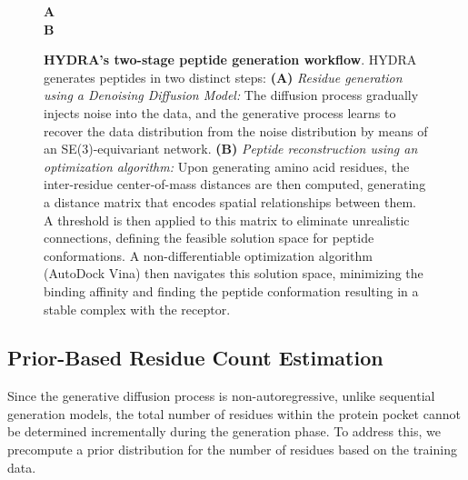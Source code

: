 \begin{figure}
  \center

  \textbf{\Large A}
   \\

  \textbf{\Large B}

  \caption{\textbf{HYDRA's two-stage peptide generation workflow}. HYDRA generates peptides in two distinct steps: \textbf{(A)} \textit{Residue generation using a Denoising Diffusion Model:} The diffusion process gradually injects noise into the data, and the generative process learns to recover the data distribution from the noise distribution by means of an SE(3)-equivariant network. \textbf{(B)} \textit{Peptide reconstruction using an optimization algorithm:} Upon generating amino acid residues, the inter-residue center-of-mass distances are then computed, generating a distance matrix that encodes spatial relationships between them. A threshold is then applied to this matrix to eliminate unrealistic connections, defining the feasible solution space for peptide conformations. A non-differentiable optimization algorithm (AutoDock Vina) then navigates this solution space, minimizing the binding affinity and finding the peptide conformation resulting in a stable complex with the receptor.}


  \label{fig:overall_figure}
\end{figure}

\subsection{Prior-Based Residue Count Estimation}
Since the generative diffusion process is non-autoregressive, unlike sequential generation models, the total number of residues within the protein pocket cannot be determined incrementally during the generation phase. To address this, we precompute a prior distribution for the number of residues based on the training data. \\

